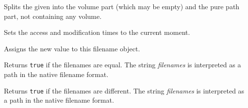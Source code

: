 Splits the given  into the volume part (which may be empty) and
the pure path part, not containing any volume.




\label{wxfilenametouch}


Sets the access and modification times to the current moment.


\label{wxfilenameoperatorassign}



Assigns the new value to this filename object.


\label{wxfilenameoperatorequal}



Returns {\tt true} if the filenames are equal. The string {\it filenames} is
interpreted as a path in the native filename format.


\label{wxfilenameoperatornotequal}



Returns {\tt true} if the filenames are different. The string {\it filenames}
is interpreted as a path in the native filename format.

